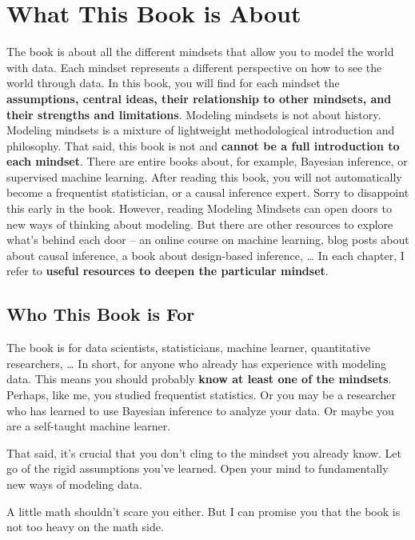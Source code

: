 \documentclass[
  10pt,
]{scrbook}
\begin{document}
\hypertarget{what-this-book-is-about}{%
\chapter{What This Book is About}\label{what-this-book-is-about}}

The book is about all the different mindsets that allow you to model the world with data.
Each mindset represents a different perspective on how to see the world through data.
In this book, you will find for each mindset the \textbf{assumptions, central ideas, their relationship to other mindsets, and their strengths and limitations}.
Modeling mindsets is not about history.
Modeling mindsets is a mixture of lightweight methodological introduction and philosophy.
That said, this book is not and \textbf{cannot be a full introduction to each mindset}.
There are entire books about, for example, Bayesian inference, or supervised machine learning.
After reading this book, you will not automatically become a frequentist statistician, or a causal inference expert.
Sorry to disappoint this early in the book.
However, reading Modeling Mindsets can open doors to new ways of thinking about modeling.
But there are other resources to explore what's behind each door -- an online course on machine learning, blog posts about about causal inference, a book about design-based inference, \ldots{}
In each chapter, I refer to \textbf{useful resources to deepen the particular mindset}.

\hypertarget{who-this-book-is-for}{%
\section{Who This Book is For}\label{who-this-book-is-for}}

The book is for data scientists, statisticians, machine learner, quantitative researchers, \ldots{}
In short, for anyone who already has experience with modeling data.
This means you should probably \textbf{know at least one of the mindsets}.
Perhaps, like me, you studied frequentist statistics.
Or you may be a researcher who has learned to use Bayesian inference to analyze your data.
Or maybe you are a self-taught machine learner.

That said, it's crucial that you don't cling to the mindset you already know.
Let go of the rigid assumptions you've learned.
Open your mind to fundamentally new ways of modeling data.

A little math shouldn't scare you either.
But I can promise you that the book is not too heavy on the math side.
\end{document}
